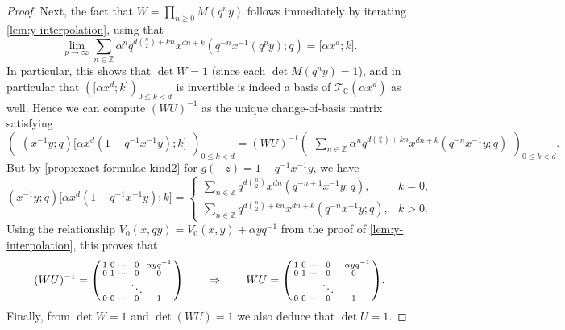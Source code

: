 \documentclass[reqno,11pt]{amsart}
\theoremstyle{definition}
\theoremstyle{remark}
\numberwithin{equation}{section}
\newcommand{\Z}{\mathbb{Z}}
\newcommand{\C}{\mathbb{C}}
\newcommand{\mT}{\mathcal{T}}
\newcommand{\vect}[2]{\big[{#1};{#2}\big]}
\newenvironment{psmall}
  {\left(\begin{smallmatrix}}
  {\end{smallmatrix}\right)}
\begin{document}
\begin{proof}
Next, the fact that $W = \prod_{n \ge 0} M\left(q^n y\right)$ follows immediately by iterating \cref{lem:y-interpolation}, using that
\[
    \lim_{p \to \infty} \sum_{n \in \Z} \alpha^n q^{d\binom{n}{2}+kn} x^{dn+k} \left(q^{-n} x^{-1} (q^p y); q\right)
    =
    \vect{\alpha x^d}{k}.
\]
In particular, this shows that $\det W = 1$ (since each $\det M\left(q^n y\right) = 1$), and in particular that $\left(\vect{\alpha x^d}{k}\right)_{0 \le k < d}$ is invertible is indeed a basis of $\mT_\C\left(\alpha x^d\right)$ as well. Hence we can compute $(WU)^{-1}$ as the unique change-of-basis matrix satisfying
\[
    \begin{pmatrix} 
    \left(x^{-1}y; q\right)\vect{\alpha x^d\left(1 - q^{-1}x^{-1}y\right)}{k}
    \end{pmatrix}_{0 \le k < d}
    =
    (WU)^{-1} 
    \begin{pmatrix}
    \sum_{n \in \Z} \alpha^n q^{d\binom{n}{2}+kn} x^{dn+k} \left(q^{-n} x^{-1} y; q\right)
    \end{pmatrix}_{0 \le k < d}.
\]
But by \cref{prop:exact-formulae-kind2} for $g(-z) = 1 - q^{-1}x^{-1}y$, we have
\[
    \left(x^{-1}y; q\right)\vect{\alpha x^d\left(1 - q^{-1}x^{-1}y\right)}{k}
    =
    \begin{cases}
    \sum_{n \in \Z} q^{d\binom{n}{2}} x^{dn} \left(q^{-n+1}x^{-1}y; q\right), 
    & k = 0,
    \\
    \sum_{n \in \Z} q^{d\binom{n}{2}+kn} x^{dn+k} \left(q^{-n}x^{-1}y; q\right),
    & k > 0.
    \end{cases}
\]
Using the relationship $V_0(x, qy) = V_0(x, y) + \alpha y q^{-1}$ from the proof of \cref{lem:y-interpolation}, this proves that
\[
    (WU)^{-1} = \begin{psmall} 
    1 & 0 & \cdots & 0 & \alpha y q^{-1}
    \\
    0 & 1 & \cdots & 0 & 0 
    \\
    & & & \ddots & \\
    0 & 0 & \cdots & 0 & 1
    \end{psmall}
    \qquad \Rightarrow 
    \qquad 
    WU = \begin{psmall} 
    1 & 0 & \cdots & 0 & -\alpha y q^{-1}
    \\
    0 & 1 & \cdots & 0 & 0 
    \\
    & & & \ddots & \\
    0 & 0 & \cdots & 0 & 1
    \end{psmall}.
\]
Finally, from $\det W = 1$ and $\det (WU) = 1$ we also deduce that $\det U = 1$.
\end{proof}
\end{document}
